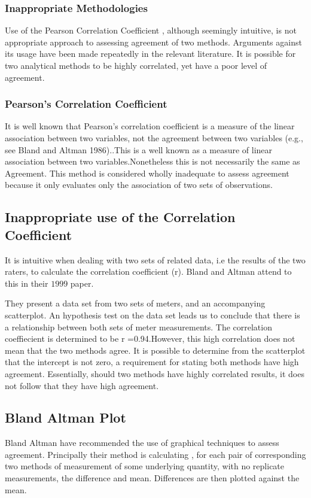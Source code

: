 \documentclass[12pt, a4paper]{report}
\theoremstyle{plain}
\theoremstyle{definition}
\theoremstyle{remark}
\begin{document}
	\subsubsection{Inappropriate Methodologies} Use of the Pearson
	Correlation Coefficient , although seemingly intuitive, is not
	appropriate approach to assessing agreement of two methods.
	Arguments against its usage have been made repeatedly in the
	relevant literature. It is possible for two analytical methods to
	be highly correlated, yet have a poor level of agreement.
	\subsubsection{Pearson's Correlation Coefficient} It is well known that
	Pearson's correlation coefficient is a measure of the linear
	association between two variables, not the agreement between two
	variables (e.g., see Bland and Altman 1986)..This is a well known
	as a measure of linear association between two
	variables.Nonetheless this is not necessarily the same as
	Agreement. This method is considered wholly inadequate to assess
	agreement because it only evaluates only the association of two
	sets of observations.
	
	\subsection{Inappropriate use of the Correlation Coefficient}
	It is intuitive when dealing with two sets of related data, i.e
	the results of the two raters,  to calculate the correlation
	coefficient (r). Bland and Altman attend to this in their $1999$
	paper.
	
	They present a data set from two sets of meters, and an
	accompanying scatterplot. An hypothesis test on the data set leads
	us to conclude that there is a relationship between both sets of
	meter measurements. The correlation coeffiecient is determined to
	be r =0.94.However, this high correlation does not mean that the
	two methods agree. It is possible to determine from the
	scatterplot that the intercept is not zero, a requirement for
	stating both methods have high agreement. Essentially, should two
	methods have highly correlated results, it does not follow that
	they have high agreement.
	
	\subsection{Bland Altman Plot}
	Bland Altman have recommended the use of graphical techniques to
	assess agreement. Principally their method is calculating , for
	each pair of corresponding two methods of measurement of some
	underlying quantity, with no replicate measurements, the
	difference and mean. Differences are then plotted against the
	mean.
	
\end{document}
